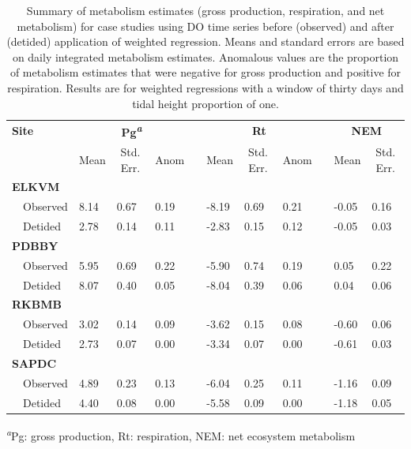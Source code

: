 \documentclass[letterpaper,12pt,oneside]{article}\usepackage[]{graphicx}\usepackage[]{color}
\begin{document}
%
\begin{table}[!tbp]
\caption{Summary of metabolism estimates (gross production, respiration, and net metabolism) for case studies using \ac{DO} time series before (observed) and after (detided) application of weighted regression.  Means and standard errors are based on daily integrated metabolism estimates.  Anomalous values are the proportion of metabolism estimates that were negative for gross production and positive for respiration.  Results are for weighted regressions with a window of thirty days and tidal height proportion of one.\label{tab:case_res}} 
\begin{center}
\begin{tabular}{llllclllcll}
\hline\hline
\multicolumn{1}{l}{\bfseries Site}&\multicolumn{3}{c}{\bfseries Pg\textsuperscript{\textit{a}}}&\multicolumn{1}{c}{\bfseries }&\multicolumn{3}{c}{\bfseries Rt}&\multicolumn{1}{c}{\bfseries }&\multicolumn{2}{c}{\bfseries NEM}\tabularnewline
\cline{2-4} \cline{6-8} \cline{10-11}
\multicolumn{1}{l}{}&\multicolumn{1}{c}{Mean}&\multicolumn{1}{c}{Std. Err.}&\multicolumn{1}{c}{Anom}&\multicolumn{1}{c}{}&\multicolumn{1}{c}{Mean}&\multicolumn{1}{c}{Std. Err.}&\multicolumn{1}{c}{Anom}&\multicolumn{1}{c}{}&\multicolumn{1}{c}{Mean}&\multicolumn{1}{c}{Std. Err.}\tabularnewline
\hline
{\bfseries ELKVM}&&&&&&&&&&\tabularnewline
~~Observed&8.14&0.67&0.19&&-8.19&0.69&0.21&&-0.05&0.16\tabularnewline
~~Detided&2.78&0.14&0.11&&-2.83&0.15&0.12&&-0.05&0.03\tabularnewline
\hline
{\bfseries PDBBY}&&&&&&&&&&\tabularnewline
~~Observed&5.95&0.69&0.22&&-5.90&0.74&0.19&& 0.05&0.22\tabularnewline
~~Detided&8.07&0.40&0.05&&-8.04&0.39&0.06&& 0.04&0.06\tabularnewline
\hline
{\bfseries RKBMB}&&&&&&&&&&\tabularnewline
~~Observed&3.02&0.14&0.09&&-3.62&0.15&0.08&&-0.60&0.06\tabularnewline
~~Detided&2.73&0.07&0.00&&-3.34&0.07&0.00&&-0.61&0.03\tabularnewline
\hline
{\bfseries SAPDC}&&&&&&&&&&\tabularnewline
~~Observed&4.89&0.23&0.13&&-6.04&0.25&0.11&&-1.16&0.09\tabularnewline
~~Detided&4.40&0.08&0.00&&-5.58&0.09&0.00&&-1.18&0.05\tabularnewline
\hline
\end{tabular}
\end{center}
\textsuperscript{\textit{a}}Pg: gross production, Rt: respiration, NEM: net ecosystem metabolism\end{table}
\end{document}

